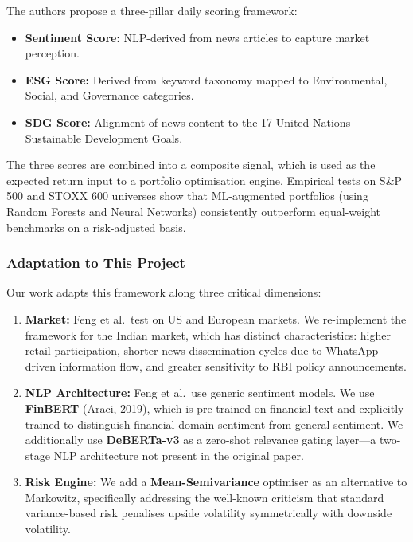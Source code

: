 \documentclass[12pt, a4paper]{article}
\begin{document}
The authors propose a three-pillar daily scoring framework:

\begin{itemize}[leftmargin=2em]
    \item \textbf{Sentiment Score:} NLP-derived from news articles to capture market perception.
    \item \textbf{ESG Score:} Derived from keyword taxonomy mapped to Environmental, Social, and Governance categories.
    \item \textbf{SDG Score:} Alignment of news content to the 17 United Nations Sustainable Development Goals.
\end{itemize}

The three scores are combined into a composite signal, which is used as the expected return input to a portfolio optimisation engine. Empirical tests on S\&P 500 and STOXX 600 universes show that ML-augmented portfolios (using Random Forests and Neural Networks) consistently outperform equal-weight benchmarks on a risk-adjusted basis.

\subsubsection*{Adaptation to This Project}

Our work adapts this framework along three critical dimensions:

\begin{enumerate}[leftmargin=2em]
    \item \textbf{Market:} Feng et al.\ test on US and European markets. We re-implement the framework for the Indian market, which has distinct characteristics: higher retail participation, shorter news dissemination cycles due to WhatsApp-driven information flow, and greater sensitivity to RBI policy announcements.
    \item \textbf{NLP Architecture:} Feng et al.\ use generic sentiment models. We use \textbf{FinBERT} (Araci, 2019), which is pre-trained on financial text and explicitly trained to distinguish financial domain sentiment from general sentiment. We additionally use \textbf{DeBERTa-v3} as a zero-shot relevance gating layer---a two-stage NLP architecture not present in the original paper.
    \item \textbf{Risk Engine:} We add a \textbf{Mean-Semivariance} optimiser as an alternative to Markowitz, specifically addressing the well-known criticism that standard variance-based risk penalises upside volatility symmetrically with downside volatility.
\end{enumerate}
\end{document}
